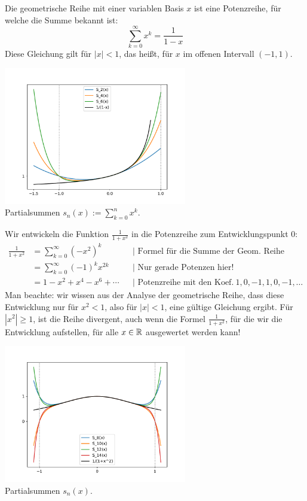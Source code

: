 \begin{bsp} 
	Die geometrische Reihe mit einer variablen Basis $x$ ist eine Potenzreihe, für welche die Summe bekannt ist: 
	\[
		\sum_{k=0}^\infty x^k = \frac{1}{1-x}
	\]
	Diese Gleichung gilt für $|x| < 1$, das heißt, für $x$ im offenen Intervall $(-1,1)$. 

	\begin{center}
	\includegraphics[width=0.6\textwidth]{pics/potenzreihe.pdf}
	\\ Partialsummen $s_n(x) := \sum_{k=0}^n x^k$.
	\end{center}
\end{bsp} 

\begin{bsp} Wir entwickeln die Funktion $\frac{1}{1+x^2}$ in die Potenzreihe zum Entwicklungspunkt $0$: 
	\begin{align*}
		\frac{1}{1+x^2} & = \sum_{k=0}^\infty (-x^2)^k & &|\text{ Formel für die Summe der Geom. Reihe}
		\\ & = \sum_{k=0}^\infty (-1)^k x^{2k} & &|\text{ Nur gerade Potenzen hier!} 
		\\ & = 1 - x^2 + x^4 - x^6 + \cdots & &| \text{ Potenzreihe mit den Koef.} \ 1, 0,-1,1,0,-1,\ldots 
	\end{align*}
	Man beachte: wir wissen aus der Analyse der geometrische Reihe, dass diese Entwicklung nur  für $x^2  < 1$, also für $|x| <1$, eine gültige Gleichung ergibt. Für $|x^2| \ge 1$, ist die Reihe divergent, auch wenn die Formel $\frac{1}{1+x^2}$, für die wir die Entwicklung aufstellen, für alle $x \in \mathbb{R}$ ausgewertet werden kann! 
	
	\begin{center}
	\includegraphics[width=0.6\textwidth]{pics/eins_durch_quadrat_plus_eins.pdf}
	\\ Partialsummen $s_n(x)$.
\end{center}

\end{bsp} 


